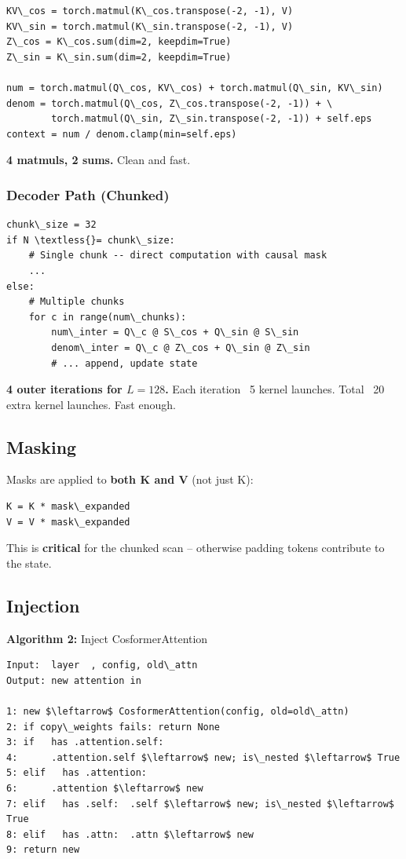 \begin{lstlisting}
KV\_cos = torch.matmul(K\_cos.transpose(-2, -1), V)
KV\_sin = torch.matmul(K\_sin.transpose(-2, -1), V)
Z\_cos = K\_cos.sum(dim=2, keepdim=True)
Z\_sin = K\_sin.sum(dim=2, keepdim=True)

num = torch.matmul(Q\_cos, KV\_cos) + torch.matmul(Q\_sin, KV\_sin)
denom = torch.matmul(Q\_cos, Z\_cos.transpose(-2, -1)) + \
        torch.matmul(Q\_sin, Z\_sin.transpose(-2, -1)) + self.eps
context = num / denom.clamp(min=self.eps)
\end{lstlisting}

\textbf{4 matmuls, 2 sums.} Clean and fast.

\subsubsection{Decoder Path (Chunked)}

\begin{lstlisting}
chunk\_size = 32
if N \textless{}= chunk\_size:
    # Single chunk -- direct computation with causal mask
    ...
else:
    # Multiple chunks
    for c in range(num\_chunks):
        num\_inter = Q\_c @ S\_cos + Q\_sin @ S\_sin
        denom\_inter = Q\_c @ Z\_cos + Q\_sin @ Z\_sin
        # ... append, update state
\end{lstlisting}

\textbf{4 outer iterations for $L = 128$.} Each iteration ~5 kernel launches. 
Total ~20 extra kernel launches. Fast enough.

\subsection{Masking}

Masks are applied to \textbf{both K and V} (not just K):

\begin{lstlisting}
K = K * mask\_expanded
V = V * mask\_expanded
\end{lstlisting}

This is \textbf{critical} for the chunked scan -- otherwise padding tokens 
contribute to the state.

\subsection{Injection}

\textbf{Algorithm 2:} Inject CosformerAttention
\begin{lstlisting}
Input:  layer  , config, old\_attn
Output: new attention in  

1: new $\leftarrow$ CosformerAttention(config, old=old\_attn)
2: if copy\_weights fails: return None
3: if   has .attention.self:
4:      .attention.self $\leftarrow$ new; is\_nested $\leftarrow$ True
5: elif   has .attention:
6:      .attention $\leftarrow$ new
7: elif   has .self:  .self $\leftarrow$ new; is\_nested $\leftarrow$ True
8: elif   has .attn:  .attn $\leftarrow$ new
9: return new
\end{lstlisting}

